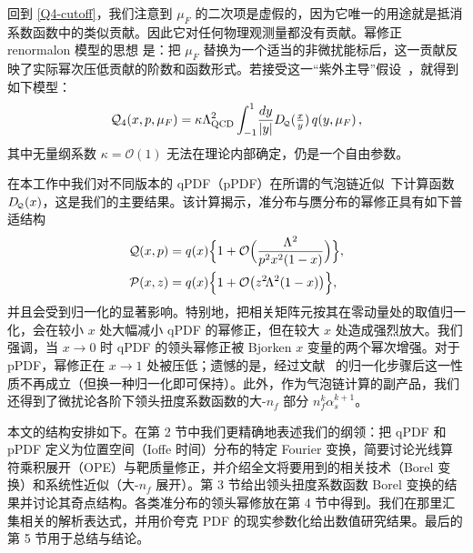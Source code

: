 回到 \eqref{Q4-cutoff}，我们注意到 $\mu_F$ 的二次项是虚假的，因为它唯一的用途就是抵消系数函数中的类似贡献。因此它对任何物理观测量都没有贡献。幂修正 renormalon 模型的思想 \cite{Beneke:1995pq,Dokshitzer:1995qm,Dasgupta:1996hh,Dasgupta:1996ki,Beneke:1997sr,Braun:2004bu} 是：把 $\mu_F$ 替换为一个适当的非微扰能标后，这一贡献反映了实际幂次压低贡献的阶数和函数形式。若接受这一``紫外主导''假设~\cite{Braun:1995tp,Beneke:1998ui,Beneke:2000kc}，就得到如下模型：
\begin{equation}
 \mathcal{Q}_4(x,p,\mu_F) = \kappa
\Lambda_{\rm QCD}^2 \int_{-1}^1 \!\frac{dy}{|y|} D_{\!\scriptscriptstyle \mathcal{Q}}(\tfrac{x}{y})\, q(y,\mu_F)\,,
\label{UV_Lambda_int}
\end{equation}
其中无量纲系数 $\kappa = \mathcal{O}(1)$ 无法在理论内部确定，仍是一个自由参数。

在本工作中我们对不同版本的 qPDF（pPDF）在所谓的气泡链近似~\cite{Beneke:1998ui}下计算函数 $D_{\!\scriptscriptstyle \mathcal{Q}}(x)$，这是我们的主要结果。该计算揭示，准分布与赝分布的幂修正具有如下普适结构
\begin{align}
 \mathcal{Q} (x,p) &=  q(x) \Big\{1 + \mathcal{O}\Big( \frac{\Lambda^2}{p^2x^2(1-x)}\Big) \Big\},
\notag\\
\mathcal{P}(x,z) &= q(x)\Big\{1 + \mathcal{O}\big( z^2\!\Lambda^2{(1-x)}\big)\Big\},
\end{align}
并且会受到归一化的显著影响。特别地，把相关矩阵元按其在零动量处的取值归一化，会在较小 $x$ 处大幅减小 qPDF 的幂修正，但在较大 $x$ 处造成强烈放大。我们强调，当 $x\to 0$ 时 qPDF 的领头幂修正被 Bjorken $x$ 变量的两个幂次增强。对于 pPDF，幂修正在 $x\to1$ 处被压低；遗憾的是，经过文献~\cite{Orginos:2017kos} 的归一化步骤后这一性质不再成立（但换一种归一化即可保持）。此外，作为气泡链计算的副产品，我们还得到了微扰论各阶下领头扭度系数函数的大-$n_f$ 部分 $n^k_f \alpha_s^{k+1}$。



本文的结构安排如下。在第 2 节中我们更精确地表述我们的纲领：把 qPDF 和 pPDF 定义为位置空间（Ioffe 时间）分布的特定 Fourier 变换，简要讨论光线算符乘积展开（OPE）与靶质量修正，并介绍全文将要用到的相关技术（Borel 变换）和系统性近似（大-$n_f$ 展开）。第 3 节给出领头扭度系数函数 Borel 变换的结果并讨论其奇点结构。各类准分布的领头幂修放在第 4 节中得到。我们在那里汇集相关的解析表达式，并用价夸克 PDF 的现实参数化给出数值研究结果。最后的第 5 节用于总结与结论。


%
